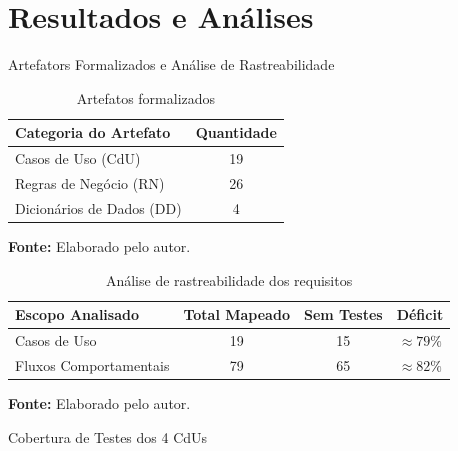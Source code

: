 \section{Resultados e Análises}

\begin{frame}{Artefators Formalizados e Análise de Rastreabilidade}

    \begin{table}[h]
        \caption{Artefatos formalizados}
        \begin{center}
            \begin{tabular}{lc}
                \toprule
                \textbf{Categoria do Artefato} & \textbf{Quantidade} \\
                \midrule
                Casos de Uso (CdU) & 19 \\
                Regras de Negócio (RN) & 26 \\
                Dicionários de Dados (DD) & 4 \\
                \bottomrule
            \end{tabular}
        \end{center}
        
    {\footnotesize \textbf{Fonte:} Elaborado pelo autor.}
  \end{table}

    \begin{table}[h]
        \caption{Análise de rastreabilidade dos requisitos}
        \begin{center}
            \begin{tabular}{lccc}
                \toprule
                \textbf{Escopo Analisado} & \textbf{Total Mapeado} & \textbf{Sem Testes} & \textbf{Déficit} \\
                \midrule
                Casos de Uso & 19 & 15 & $\approx 79\%$ \\
                Fluxos Comportamentais & 79 & 65 & $\approx 82\%$ \\
                \bottomrule
            \end{tabular}
    
            {\footnotesize \textbf{Fonte:} Elaborado pelo autor.}
        \end{center}
    \end{table}
\end{frame}

\begin{frame}{Cobertura de Testes dos 4 CdUs}
    
\end{frame}

